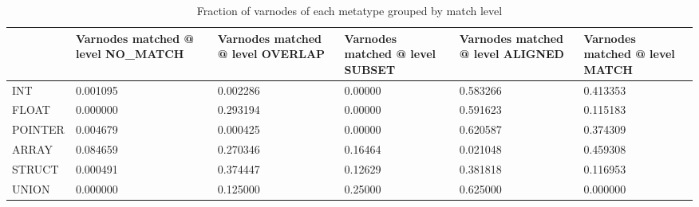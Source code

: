 \begin{table}[t]
\centering
\caption{Fraction of varnodes of each metatype grouped by match level}
\label{table:metatype-match-levels-ratios}
\begin{tabular}{lp{3.6cm}p{3.6cm}p{3.6cm}p{3.6cm}p{3.6cm}}
\toprule
{} &  Varnodes matched @ level NO\_MATCH &  Varnodes matched @ level OVERLAP &  Varnodes matched @ level SUBSET &  Varnodes matched @ level ALIGNED &  Varnodes matched @ level MATCH \\
\midrule
INT     &                           0.001095 &                          0.002286 &                          0.00000 &                          0.583266 &                        0.413353 \\
FLOAT   &                           0.000000 &                          0.293194 &                          0.00000 &                          0.591623 &                        0.115183 \\
POINTER &                           0.004679 &                          0.000425 &                          0.00000 &                          0.620587 &                        0.374309 \\
ARRAY   &                           0.084659 &                          0.270346 &                          0.16464 &                          0.021048 &                        0.459308 \\
STRUCT  &                           0.000491 &                          0.374447 &                          0.12629 &                          0.381818 &                        0.116953 \\
UNION   &                           0.000000 &                          0.125000 &                          0.25000 &                          0.625000 &                        0.000000 \\
\bottomrule
\end{tabular}
\end{table}
